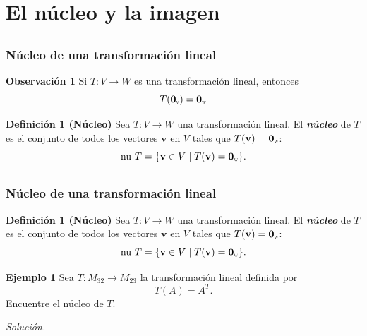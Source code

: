 \section{El núcleo y la imagen }

\subsection{}

\begin{frame}\frametitle{Núcleo de una transformación lineal}

\begin{alertblock}{\textbf{Observación 1}}
	Si $T:V\to W$ es una transformación lineal, entonces
	\[
		T(\mathbf{0}_{\scalebox{0.4}{V}}) = \mathbf{0}_{\scalebox{0.4}{W}}	
	\]
\end{alertblock}

\begin{block}{\textbf{Definición 1 (Núcleo)}}
	\justifying
	Sea $T:V\to W$ una transformación lineal. El \textbf{\textit{núcleo}} de $T$ es el conjunto de 
	todos los vectores $\mathbf{v}$ en $V$ tales que $T(\mathbf{v}) = \mathbf{0}_{\scalebox{0.4}{W}}$:
	\[
		\text{nu}\ T = \{ \mathbf{v}\in V \mid T(\mathbf{v}) = \mathbf{0}_{\scalebox{0.4}{W}} \}.
	\]
\end{block}


\end{frame}


\subsection{}

\begin{frame}\frametitle{Núcleo de una transformación lineal}
		
	\begin{block}{\textbf{Definición 1 (Núcleo)}}
		\justifying
		Sea $T:V\to W$ una transformación lineal. El \textbf{\textit{núcleo}} de $T$ es el conjunto de 
		todos los vectores $\mathbf{v}$ en $V$ tales que $T(\mathbf{v}) = \mathbf{0}_{\scalebox{0.4}{W}}$:
		\[
		\text{nu}\ T = \{ \mathbf{v}\in V \mid T(\mathbf{v}) = \mathbf{0}_{\scalebox{0.4}{W}} \}.
		\]
	\end{block}
	
	\begin{ej}{\textbf{Ejemplo 1}}
		\justifying
		Sea $T:M_{32}\to M_{23}$ la transformación lineal definida por
		\[
		T(A) = A^T.
		\]
		Encuentre el núcleo de $T$.
	\end{ej}
	\textit{Solución.}
	
\end{frame}

